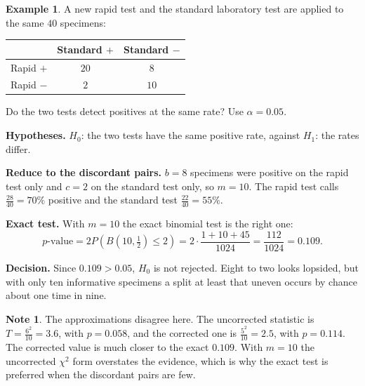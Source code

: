 \documentclass[11pt,a4paper]{article}
\theoremstyle{definition}
\newtheorem{example}[thm]{Example}
\newtheorem{note}[thm]{Note}
\begin{document}
\begin{example}
A new rapid test and the standard laboratory test are applied to the same $40$
specimens:
\begin{center}
\begin{tabular}{l|cc}
 & Standard $+$ & Standard $-$\\\hline
Rapid $+$ & $20$ & $8$\\
Rapid $-$ & $2$ & $10$
\end{tabular}
\end{center}
Do the two tests detect positives at the same rate? Use $\alpha = 0.05$.

\textbf{Hypotheses.} $H_0$: the two tests have the same positive rate, against $H_1$:
the rates differ.

\textbf{Reduce to the discordant pairs.} $b = 8$ specimens were positive on the rapid
test only and $c = 2$ on the standard test only, so $m = 10$. The rapid test calls
$\frac{28}{40} = 70\%$ positive and the standard test $\frac{22}{40} = 55\%$.

\textbf{Exact test.} With $m = 10$ the exact binomial test is the right one:
\[p\text{-value} = 2P\left(B\left(10,\tfrac12\right)\leq 2\right)
 = 2\cdot\frac{1+10+45}{1024} = \frac{112}{1024} = 0.109.\]

\textbf{Decision.} Since $0.109>0.05$, $H_0$ is not rejected. Eight to two looks
lopsided, but with only ten informative specimens a split at least that uneven occurs
by chance about one time in nine.
\end{example}

\begin{note}
The approximations disagree here. The uncorrected statistic is
$T = \frac{6^{2}}{10} = 3.6$, with $p = 0.058$, and the corrected one is
$\frac{5^{2}}{10} = 2.5$, with $p = 0.114$. The corrected value is much closer to the
exact $0.109$. With $m = 10$ the uncorrected $\chi^{2}$ form overstates the evidence, which
is why the exact test is preferred when the discordant pairs are few.
\end{note}
\end{document}

